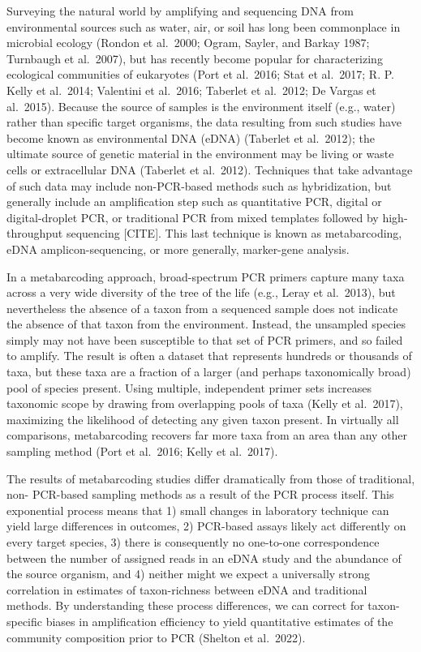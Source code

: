 \documentclass[
]{article}
\begin{document}
Surveying the natural world by amplifying and sequencing DNA from
environmental sources such as water, air, or soil has long been
commonplace in microbial ecology (Rondon et al.~2000; Ogram, Sayler, and
Barkay 1987; Turnbaugh et al.~2007), but has recently become popular for
characterizing ecological communities of eukaryotes (Port et al.~2016;
Stat et al.~2017; R. P. Kelly et al.~2014; Valentini et al.~2016;
Taberlet et al.~2012; De Vargas et al.~2015). Because the source of
samples is the environment itself (e.g., water) rather than specific
target organisms, the data resulting from such studies have become known
as environmental DNA (eDNA) (Taberlet et al.~2012); the ultimate source
of genetic material in the environment may be living or waste cells or
extracellular DNA (Taberlet et al.~2012). Techniques that take advantage
of such data may include non-PCR-based methods such as hybridization,
but generally include an amplification step such as quantitative PCR,
digital or digital-droplet PCR, or traditional PCR from mixed templates
followed by high-throughput sequencing {[}CITE{]}. This last technique
is known as metabarcoding, eDNA amplicon-sequencing, or more generally,
marker-gene analysis.

In a metabarcoding approach, broad-spectrum PCR primers capture many
taxa across a very wide diversity of the tree of the life (e.g., Leray
et al.~2013), but nevertheless the absence of a taxon from a sequenced
sample does not indicate the absence of that taxon from the environment.
Instead, the unsampled species simply may not have been susceptible to
that set of PCR primers, and so failed to amplify. The result is often a
dataset that represents hundreds or thousands of taxa, but these taxa
are a fraction of a larger (and perhaps taxonomically broad) pool of
species present. Using multiple, independent primer sets increases
taxonomic scope by drawing from overlapping pools of taxa (Kelly et
al.~2017), maximizing the likelihood of detecting any given taxon
present. In virtually all comparisons, metabarcoding recovers far more
taxa from an area than any other sampling method (Port et al.~2016;
Kelly et al.~2017).

The results of metabarcoding studies differ dramatically from those of
traditional, non- PCR-based sampling methods as a result of the PCR
process itself. This exponential process means that 1) small changes in
laboratory technique can yield large differences in outcomes, 2)
PCR-based assays likely act differently on every target species, 3)
there is consequently no one-to-one correspondence between the number of
assigned reads in an eDNA study and the abundance of the source
organism, and 4) neither might we expect a universally strong
correlation in estimates of taxon-richness between eDNA and traditional
methods. By understanding these process differences, we can correct for
taxon-specific biases in amplification efficiency to yield quantitative
estimates of the community composition prior to PCR (Shelton et
al.~2022).
\end{document}
